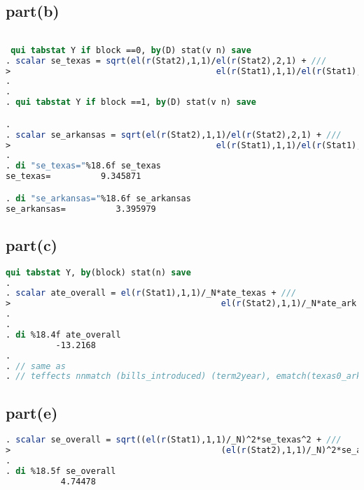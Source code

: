 \documentclass[a4paper]{article}
\begin{document}
\subsection*{part(b)}
\begin{lstlisting}[language=stata]

 qui tabstat Y if block ==0, by(D) stat(v n) save        
. scalar se_texas = sqrt(el(r(Stat2),1,1)/el(r(Stat2),2,1) + /// 
>                                         el(r(Stat1),1,1)/el(r(Stat1),2,1))
.                                         
. 
. qui tabstat Y if block ==1, by(D) stat(v n) save        

. 
. scalar se_arkansas = sqrt(el(r(Stat2),1,1)/el(r(Stat2),2,1) + /// 
>                                         el(r(Stat1),1,1)/el(r(Stat1),2,1)) 
. 
. di "se_texas="%18.6f se_texas
se_texas=          9.345871

. di "se_arkansas="%18.6f se_arkansas
se_arkansas=          3.395979

\end{lstlisting}
\subsection*{part(c)}
\begin{lstlisting}[language=stata]
 qui tabstat Y, by(block) stat(n) save   
. 
. scalar ate_overall = el(r(Stat1),1,1)/_N*ate_texas + /// 
>                                          el(r(Stat2),1,1)/_N*ate_ark
. 
. 
. di %18.4f ate_overall
          -13.2168
. 
. // same as
. // teffects nnmatch (bills_introduced) (term2year), ematch(texas0_arkansas1)

\end{lstlisting}
\subsection*{part(e)}
\begin{lstlisting}[language=stata]
. scalar se_overall = sqrt((el(r(Stat1),1,1)/_N)^2*se_texas^2 + /// 
>                                          (el(r(Stat2),1,1)/_N)^2*se_arkansas^2)
.                                          
. di %18.5f se_overall
           4.74478

\end{lstlisting}
\end{document}
